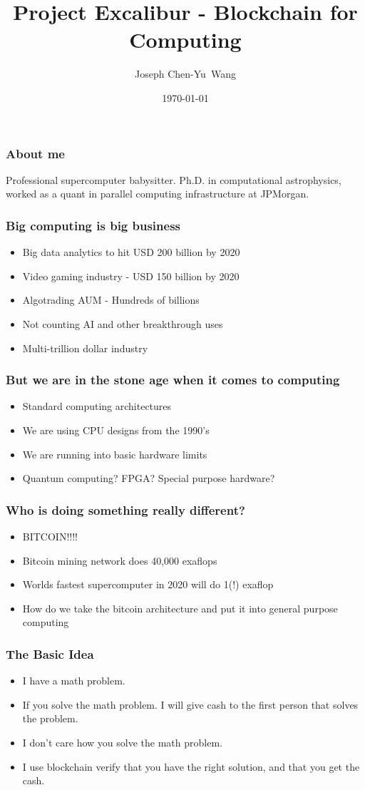 \documentclass{beamer}
\title {Project Excalibur - Blockchain for Computing}
\author{Joseph Chen-Yu~Wang}
\institute{In association with the Banzai Institute of Advanced Research\\
  and the Hong Kong Caviliers}
\date{\today}
\begin{document}
\frame{\titlepage}
\begin{frame}
  \frametitle{About me}
Professional supercomputer babysitter.  Ph.D. in computational
astrophysics, worked as a quant in parallel computing 
infrastructure at JPMorgan.
\end{frame}
\begin{frame}
  \frametitle{Big computing is big business}
  \begin{itemize}
  \item Big data analytics to hit USD 200 billion by 2020
  \item Video gaming industry - USD 150 billion by 2020
  \item Algotrading AUM - Hundreds of billions
  \item Not counting AI and other breakthrough uses
  \item Multi-trillion dollar industry
  \end{itemize}
\end{frame}
\begin{frame}
  \frametitle{But we are in the stone age when it comes to computing}
  \begin{itemize}
  \item Standard computing architectures
  \item We are using CPU designs from the 1990's
  \item We are running into basic hardware limits
  \item Quantum computing?  FPGA? Special purpose hardware?
  \end{itemize}
\end{frame} 
\begin{frame}
  \frametitle{Who is doing something really different?}
  \begin{itemize}
  \item BITCOIN!!!!
  \item Bitcoin mining network does 40,000 exaflops
  \item Worlds fastest supercomputer in 2020 will do 1(!) exaflop
  \item How do we take the bitcoin architecture and put it into
    general purpose computing
  \end{itemize}
\end{frame}
\begin{frame}
  \frametitle{The Basic Idea}
  \begin{itemize}
  \item I have a math problem.
  \item If you solve the math problem.  I will give cash to the first
    person that solves the problem.
  \item I don't care how you solve the math problem.
  \item I use blockchain verify that you have the right
    solution, and that you get the cash.
  \end{itemize}
\end{frame}
\end{document}
